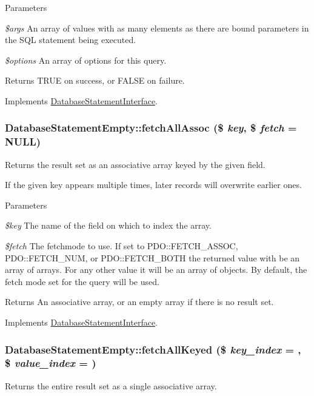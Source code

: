 \begin{DoxyParams}{Parameters}
\item[{\em \$args}]An array of values with as many elements as there are bound parameters in the SQL statement being executed. \item[{\em \$options}]An array of options for this query.\end{DoxyParams}
\begin{DoxyReturn}{Returns}
TRUE on success, or FALSE on failure. 
\end{DoxyReturn}


Implements \hyperlink{interfaceDatabaseStatementInterface_a716e454a44a7667f7a90b90c1a6fe3eb}{DatabaseStatementInterface}.\hypertarget{classDatabaseStatementEmpty_a7715d753726ebd0b6c292faabfc4ed90}{
\subsubsection[{fetchAllAssoc}]{\setlength{\rightskip}{0pt plus 5cm}DatabaseStatementEmpty::fetchAllAssoc (\$ {\em key}, \/  \$ {\em fetch} = {\ttfamily NULL})}}
\label{classDatabaseStatementEmpty_a7715d753726ebd0b6c292faabfc4ed90}
Returns the result set as an associative array keyed by the given field.

If the given key appears multiple times, later records will overwrite earlier ones.


\begin{DoxyParams}{Parameters}
\item[{\em \$key}]The name of the field on which to index the array. \item[{\em \$fetch}]The fetchmode to use. If set to PDO::FETCH\_\-ASSOC, PDO::FETCH\_\-NUM, or PDO::FETCH\_\-BOTH the returned value with be an array of arrays. For any other value it will be an array of objects. By default, the fetch mode set for the query will be used.\end{DoxyParams}
\begin{DoxyReturn}{Returns}
An associative array, or an empty array if there is no result set. 
\end{DoxyReturn}


Implements \hyperlink{interfaceDatabaseStatementInterface_a8be68ba0a27dc2f5358c5bcf3243108b}{DatabaseStatementInterface}.\hypertarget{classDatabaseStatementEmpty_ab0bfa3541bdfb1f7003f15363911c99f}{
\subsubsection[{fetchAllKeyed}]{\setlength{\rightskip}{0pt plus 5cm}DatabaseStatementEmpty::fetchAllKeyed (\$ {\em key\_\-index} = {}, \/  \$ {\em value\_\-index} = {})}}
\label{classDatabaseStatementEmpty_ab0bfa3541bdfb1f7003f15363911c99f}
Returns the entire result set as a single associative array.

